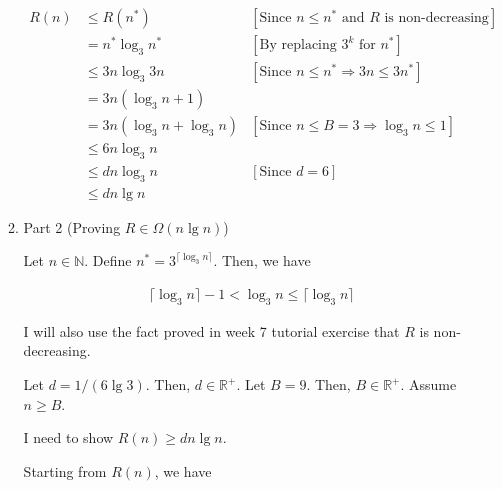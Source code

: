 \documentclass[12pt]{article}
\begin{document}
\begin{itemize}
\begin{mdframed}
\begin{enumerate}[1.]
\begin{mdframed}
            \begin{align}
                R(n) &\leq R(n^*) & [\text{Since $n \leq n^*$ and $R$ is non-decreasing}]\\
                &= n^* \log_3 n^* & [\text{By replacing $3^k$ for $n^*$}]\\
                &\leq 3n \log_3 3n & [\text{Since $n \leq n^* \Rightarrow 3n \leq 3n^*$}]\\
                &= 3n(\log_3 n + 1)\\
                &= 3n(\log_3 n + \log_3 n) & [\text{Since $n \leq B = 3 \Rightarrow \log_3 n \leq 1$}]\\
                &\leq 6n\log_3 n\\
                &\leq dn\log_3 n & [\text{Since $d = 6$}]\\
                &\leq dn\lg n
            \end{align}

            \end{mdframed}

            \item Part 2 (Proving $R \in \Omega(n \lg n)$)

            \begin{mdframed}
            Let $n \in \mathbb{N}$. Define $n^* = 3^{\lceil \log_3 n \rceil}$.
            Then, we have

            \begin{align}
                \lceil \log_3 n \rceil - 1 < \log_3 n \leq \lceil \log_3 n \rceil
            \end{align}

            \bigskip

            I will also use the fact proved in week 7 tutorial exercise that
            $R$ is non-decreasing.

            \bigskip

            Let $d = 1/(6\lg 3)$. Then, $d \in \mathbb{R}^+$. Let $B = 9$. Then, $B \in \mathbb{R}^+$.
            Assume $n \geq B$.

            \bigskip

            I need to show $R(n) \geq dn\lg n$.

            \bigskip

            Starting from $R(n)$, we have


\end{mdframed}
\end{enumerate}
\end{mdframed}
\end{itemize}
\end{document}
